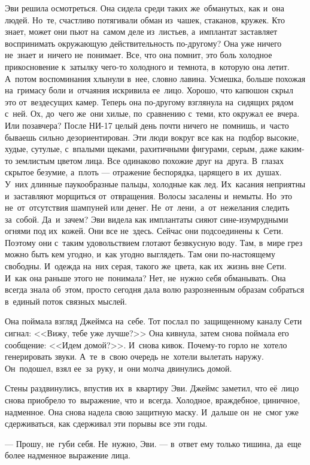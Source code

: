Эви решила осмотреться.
Она сидела среди таких же~обманутых, как и~она людей.
Но~те, счастливо потягивали обман из~чашек, стаканов, кружек.
Кто знает, может они пьют на~самом деле из~листьев, а~имплантат заставляет воспринимать окружающую действительность по-другому? Она уже ничего не~знает и~ничего не~понимает.
Все, что она помнит, это боль холодное прикосновение к~затылку чего-то холодного и~темнота, в~которую она летит.
А~потом воспоминания хлынули в~нее, словно лавина.
Усмешка, больше похожая на~гримасу боли и~отчаяния искривила ее~лицо.
Хорошо, что капюшон скрыл это от~вездесущих камер.
Теперь она по-другому взглянула на~сидящих рядом с~ней.
Ох, до~чего же~они хилые, по~сравнению с~теми, кто окружал ее~вчера.
Или позавчера? После НИ-17 целый день почти ничего не~помнишь, и~часто бываешь сильно дезориентирован.
Эти люди вокруг все как на~подбор высокие, худые, сутулые, с~впалыми щеками, рахитичными фигурами, серым, даже каким-то землистым цветом лица.
Все одинаково похожие друг на~друга.
В~глазах скрытое безумие, а~плоть --- отражение беспорядка, царящего в~их~душах.
У~них длинные паукообразные пальцы, холодные как лед.
Их~касания неприятны и~заставляют морщиться от~отвращения.
Волосы засалены и~немыты.
Но~это не~от~отсутствия шампуней или денег.
Не~от~лени,~а~от~нежелания следить за~собой.
Да~и~зачем? Эви видела как имплантаты сияют сине-изумрудными огнями под их~кожей.
Они все не~здесь.
Сейчас они подсоединены к~Сети.
Поэтому они с~таким удовольствием глотают безвкусную воду.
Там, в~мире грез можно быть кем угодно, и~как угодно выглядеть.
Там они по-настоящему свободны.
И~одежда на~них серая, такого же~цвета, как их~жизнь вне Сети.
И~как она раньше этого не~понимала? Нет, не~нужно себя обманывать.
Она всегда знала об~этом, просто сегодня дала волю разрозненным образам собраться в~единый поток связных мыслей.

Она поймала взгляд Джеймса на~себе.
Тот послал по~защищенному каналу Сети сигнал: <<Вижу, тебе уже лучше?>>
Она кивнула, затем снова поймала его сообщение: <<Идем домой?>>.
И~снова кивок.
Почему-то горло не~хотело генерировать звуки.
А~те~в~свою очередь не~хотели вылетать наружу.
Он~подошел, взял ее~за~руку, и~они молча двинулись домой.

Стены раздвинулись, впустив их~в~квартиру Эви.
Джеймс заметил, что её~лицо снова приобрело то~выражение, что и~всегда.
Холодное, враждебное, циничное, надменное.
Она снова надела свою защитную маску.
И~дальше он~не~смог уже сдерживаться, как сдерживал эти порывы все эти годы.
 
 --- Прошу, не~губи себя.
Не~нужно, Эви. --- в~ответ ему только тишина, да~еще более надменное выражение лица.

